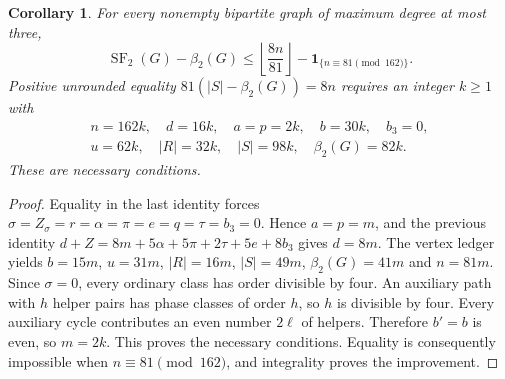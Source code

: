 \documentclass[11pt]{article}
\newtheorem{corollary}[theorem]{Corollary}
\newcommand{\SF}{\operatorname{SF}_2}
\newcommand{\diss}{\beta_2}
\begin{document}
\begin{corollary}\label{cor:subcubic-parity}
For every nonempty bipartite graph of maximum degree at most three,
\[
 \SF(G)-\diss(G)\le
 \left\lfloor\frac{8n}{81}\right\rfloor
       -\mathbf1_{\{n\equiv81\pmod{162}\}}.
\]
Positive unrounded equality $81(|S|-\diss(G))=8n$ requires an integer
$k\ge1$ with
\[
\begin{gathered}
 n=162k,\quad d=16k,\quad a=p=2k,\quad b=30k,\quad b_3=0,\\
 u=62k,\quad |R|=32k,\quad |S|=98k,\quad \diss(G)=82k.
\end{gathered}
\]
These are necessary conditions.
\end{corollary}
\begin{proof}
Equality in the last identity forces
$\sigma=Z_\sigma=r=\alpha=\pi=e=q=\tau=b_3=0$.
Hence $a=p=m$, and the previous identity $d+Z=8m+5\alpha+5\pi+
2\tau+5e+8b_3$ gives $d=8m$. The vertex ledger yields
$b=15m$, $u=31m$, $|R|=16m$, $|S|=49m$, $\diss(G)=41m$ and $n=81m$.
Since $\sigma=0$, every ordinary class has order divisible by four.
An auxiliary path with $h$ helper pairs has phase classes of order $h$,
so $h$ is divisible by four. Every auxiliary cycle contributes an even
number $2\ell$ of helpers. Therefore $b'=b$ is even, so $m=2k$.
This proves the necessary conditions. Equality is consequently impossible
when $n\equiv81\pmod{162}$, and integrality proves the improvement.
\end{proof}
\end{document}
